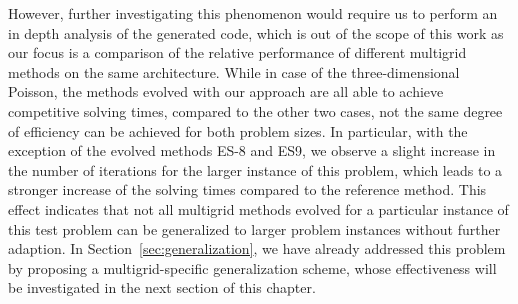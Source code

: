 However, further investigating this phenomenon would require us to perform an in depth analysis of the generated code, which is out of the scope of this work as our focus is a comparison of the relative performance of different multigrid methods on the same architecture.
While in case of the three-dimensional Poisson, the methods evolved with our approach are all able to achieve competitive solving times, compared to the other two cases, not the same degree of efficiency can be achieved for both problem sizes.
In particular, with the exception of the evolved methods ES-8 and ES9, we observe a slight increase in the number of iterations for the larger instance of this problem, which leads to a stronger increase of the solving times compared to the reference method.
This effect indicates that not all multigrid methods evolved for a particular instance of this test problem can be generalized to larger problem instances without further adaption.
In Section~\ref{sec:generalization}, we have already addressed this problem by proposing a multigrid-specific generalization scheme, whose effectiveness will be investigated in the next section of this chapter.   

